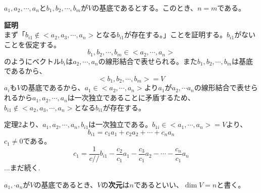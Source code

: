 \documentclass{jlreq}
\begin{document}
\begin{theorembox}[定理4]
  $a_1, a_2, \cdots, a_n$と$b_1, b_2, \cdots, b_m$が$V$の基底であるとする。このとき、$n = m$である。

  \dotfill

  \textbf{証明} \\

  まず「$b_{i1} \notin <a_2, a_3, \cdots, a_n>$となる$b_{i1}$が存在する。」ことを証明する。$b_{i1}$がないことを仮定する。
  \begin{equation*}
    b_1, b_2, \cdots, b_m \in <a_2, \cdots, a_n>
  \end{equation*}
  のようにベクトル$b_i$は$a_2, \cdots, a_n$の線形結合で表せられる。また$b_1, b_2, \cdots, b_m$は基底であるから、
  \begin{equation*}
    <b_1, b_2, \cdots, b_m> = V
  \end{equation*}
  $a_i$も$V$の基底であるから、$a_1 \in <a_2, \cdots, a_n>$より$a_1$が$a_2, \cdots a_n$の線形結合で表せられるから$a_1, a_2, \cdots, a_n$は一次独立であることに矛盾するため、$b_{i1} \notin <a_2, a_3, \cdots, a_n>$となる$b_{i1}$が存在する。

  定理2より、$a_1, a_2, \cdots, a_n, b_{i1}$は一次独立である。$b_{1i} \in <a_1, \cdots, a_n> = V$より、
  \begin{equation*}
    b_{i1} = c_1 a_1 + c_2 a_2 + \cdots + c_n a_n
  \end{equation*}
  $c_1 \neq 0$である。
  \begin{equation*}
    c_1 = \frac{1}{c//} b_{i1} - \frac{c_2}{c_1} a_1 - \frac{c_3}{c_1} a_2 - \cdots - \frac{c_n}{c_1} a_n
  \end{equation*}
  ...まだ続く. 
\end{theorembox}

\begin{definitionbox}[次元]
  $a_1, \cdot a_n$が$V$の基底であるとき、$V$の\textbf{次元}は$n$であるといい、$\dim V = n$と書く。
\end{definitionbox}
\end{document}
